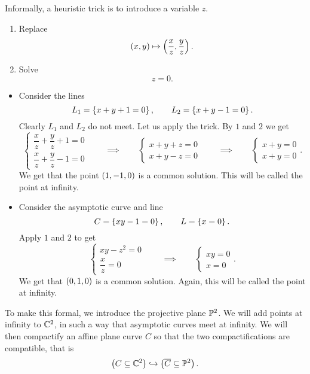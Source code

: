 Informally, a heuristic trick is to introduce a variable $ z $.
\begin{enumerate}
\item Replace
$$ \rb{x, y} \mapsto \rb{\dfrac{x}{z}, \dfrac{y}{z}}. $$
\item Solve
$$ z = 0. $$
\end{enumerate}

\begin{example}
\hfill
\begin{itemize}
\item Consider the lines
$$ L_1 = \cb{x + y + 1 = 0}, \qquad L_2 = \cb{x + y - 1 = 0}. $$
Clearly $ L_1 $ and $ L_2 $ do not meet. Let us apply the trick. By $ 1 $ and $ 2 $ we get
$$
\begin{cases}
\dfrac{x}{z} + \dfrac{y}{z} + 1 = 0 \\
\dfrac{x}{z} + \dfrac{y}{z} - 1 = 0
\end{cases}
\qquad \implies \qquad
\begin{cases}
x + y + z = 0 \\
x + y - z = 0
\end{cases}
\qquad \implies \qquad
\begin{cases}
x + y = 0 \\
x + y = 0
\end{cases}.
$$
We get that the point $ \rb{1, -1, 0} $ is a common solution. This will be called the point at infinity.
\item Consider the asymptotic curve and line
$$ C = \cb{xy - 1 = 0}, \qquad L = \cb{x = 0}. $$
Apply $ 1 $ and $ 2 $ to get
$$
\begin{cases}
xy - z^2 = 0 \\
\dfrac{x}{z} = 0
\end{cases}
\qquad \implies \qquad
\begin{cases}
xy = 0 \\
x = 0
\end{cases}.
$$
We get that $ \rb{0, 1, 0} $ is a common solution. Again, this will be called the point at infinity.
\end{itemize}
\end{example}

\pagebreak

To make this formal, we introduce the projective plane $ \P^2 $. We will add points at infinity to $ \C^2 $, in such a way that asymptotic curves meet at infinity. We will then compactify an affine plane curve $ C $ so that the two compactifications are compatible, that is
$$ \rb{C \subseteq \C^2} \hookrightarrow \rb{\overline{C} \subseteq \P^2}. $$

